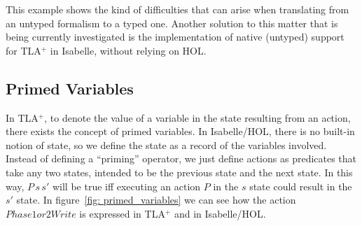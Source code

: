 \notla

This example shows the kind of difficulties that can arise when translating
from an untyped formalism to a typed one. Another solution to this
matter that is being currently investigated is the implementation
of native (untyped) support for TLA$^{+}$ in Isabelle, without relying
on HOL. 


\subsection{Primed Variables}

In TLA$^{+}$, to denote the value of a variable in the state resulting
from an action, there exists the concept of primed variables. In Isabelle/HOL,
there is no built-in notion of state, so we define the state as a record of
the variables involved. Instead of defining a {}``priming'' operator,
we just define actions as predicates that take any two states, intended
to be the previous state and the next state. In this way, $P\, s\, s'$
will be true iff executing an action $P$ in the $s$ state could
result in the $s'$ state. In figure~\ref{fig: primed_variables}
we can see how the action $Phase1or2Write$ is expressed in TLA$^{+}$
and in Isabelle/HOL.

